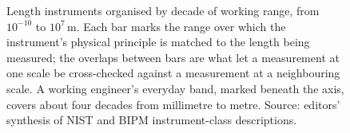 \begin{figure}[p]
\caption[Length instruments organised by decade of working
range]{Length instruments organised by decade of working range, from
$10^{-10}$ to $10^{7} \,\si{\meter}$. Each bar marks the range over
which the instrument's physical principle is matched to the length
being measured; the overlaps between bars are what let a measurement
at one scale be cross-checked against a measurement at a neighbouring
scale. A working engineer's everyday band, marked beneath the axis,
covers about four decades from millimetre to metre. Source: editors'
synthesis of NIST and BIPM instrument-class descriptions.}
\label{fig:vol01:ch07:length-ladder}
\end{figure}
